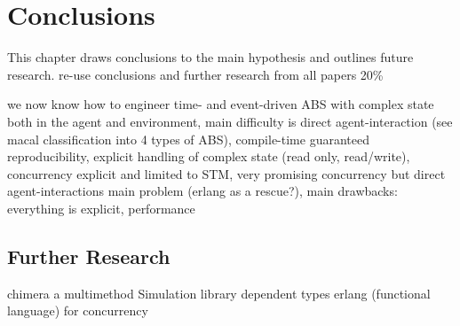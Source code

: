 \chapter{Conclusions}

This chapter draws conclusions to the main hypothesis and outlines future research.
re-use conclusions and further research from all papers
20\%

we now know how to engineer time- and event-driven ABS with complex state both in the agent and environment, main difficulty is direct agent-interaction (see macal classification into 4 types of ABS), compile-time guaranteed reproducibility, explicit handling of complex state (read only, read/write), concurrency explicit and limited to STM, very promising concurrency but direct agent-interactions main problem (erlang as a rescue?), main drawbacks: everything is explicit, performance

\section{Further Research}
chimera a multimethod Simulation library
dependent types
erlang (functional language) for concurrency